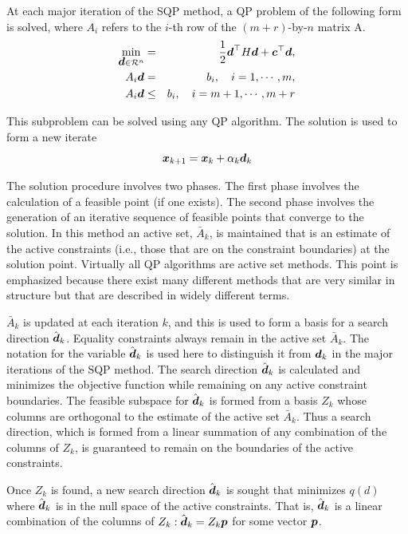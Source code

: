 \documentclass[journal,comsoc]{IEEEtran}
\begin{document}
 At each major iteration of the SQP method, a QP problem of the following form is solved, where $A_i$ refers to the $i$-th row of the $(m+r)$-by-$n$ matrix A.
\begin{eqnarray}
     \min_{\mbox{\boldmath $d$} \in \mathcal{R}^n} & = & \frac{1}{2} \mbox{\boldmath $d$}^\top H\mbox{\boldmath $d$} + \mbox{\boldmath $c$}^\top \mbox{\boldmath $d$}, \label{subqp}\\
     A_i \mbox{\boldmath $d$} & = & b_i,\quad i = 1, \cdots, m, \nonumber \\
     A_i \mbox{\boldmath $d$} & \leq & b_i, \quad i = m+1, \cdots, m+r \nonumber
\end{eqnarray}

 
This subproblem can be solved using any QP algorithm. The solution is used to form a new iterate
\begin{equation}
  \mbox{\boldmath $x$}_{k+1} = \mbox{\boldmath $x$}_k + \alpha_k \mbox{\boldmath $d$}_k
\end{equation}
 
 The solution procedure involves two phases. The first phase involves the calculation of a feasible point (if one exists). The second phase involves the generation of an iterative sequence of feasible points that converge to the solution. In this method an active set, $\bar{A}_k$, is maintained that is an estimate of the active constraints (i.e., those that are on the constraint boundaries) at the solution point. Virtually all QP algorithms are active set methods. This point is emphasized because there exist many different methods that are very similar in structure but that are described in widely different terms.
 
 $\bar{A}_k$ is updated at each iteration $k$, and this is used to form a basis for a search direction $\hat{\mbox{\boldmath $d$}}_k$. Equality constraints always remain in the active set $\bar{A}_k$. The notation for the variable $\hat{\mbox{\boldmath $d$}}_k$ is used here to distinguish it from $\mbox{\boldmath $d$}_k$ in the major iterations of the SQP method. The search direction $\hat{\mbox{\boldmath $d$}}_k$ is calculated and minimizes the objective function while remaining on any active constraint boundaries. The feasible subspace for $\hat{\mbox{\boldmath $d$}}_k$ is formed from a basis $Z_k$ whose columns are orthogonal to the estimate of the active set $\bar{A}_k$. Thus a search direction, which is formed from a linear summation of any combination of the columns of $Z_k$, is guaranteed to remain on the boundaries of the active constraints. 
 
 Once $Z_k$ is found, a new search direction $\hat{\mbox{\boldmath $d$}}_k$ is sought that minimizes $q(d)$ where $\hat{\mbox{\boldmath $d$}}_k$ is in the null space of the active constraints. That is, $\hat{\mbox{\boldmath $d$}}_k$ is a linear combination of the columns of $Z_k: \hat{\mbox{\boldmath $d$}}_k = Z_k \mbox{\boldmath $p$}$ for some vector $\mbox{\boldmath $p$}$.
 
\end{document}
